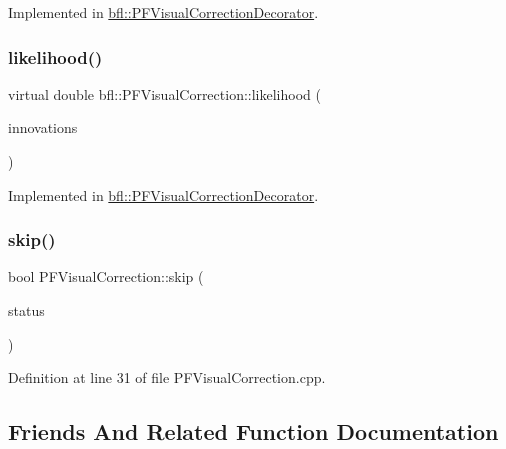 Implemented in \mbox{\hyperlink{classbfl_1_1PFVisualCorrectionDecorator_abf6fcd12be618e8eda474b4c9638760e}{bfl\+::\+P\+F\+Visual\+Correction\+Decorator}}.

\mbox{\label{classbfl_1_1PFVisualCorrection_a57527f43323af18321bd9654a4bb00d5}} 
\subsubsection{\texorpdfstring{likelihood()}{likelihood()}}
{\footnotesize\ttfamily virtual double bfl\+::\+P\+F\+Visual\+Correction\+::likelihood (\begin{DoxyParamCaption}\item[{const Eigen\+::\+Ref$<$ const Eigen\+::\+Matrix\+Xf $>$ \&}]{innovations }\end{DoxyParamCaption})\hspace{0.3cm}{\ttfamily [pure virtual]}}



Implemented in \mbox{\hyperlink{classbfl_1_1PFVisualCorrectionDecorator_a6e1f993c57e8bdbb03ad6996aa122c6c}{bfl\+::\+P\+F\+Visual\+Correction\+Decorator}}.

\mbox{\label{classbfl_1_1PFVisualCorrection_afbe70e2ab0be5459c79fe4eabd27cf9f}} 
\subsubsection{\texorpdfstring{skip()}{skip()}}
{\footnotesize\ttfamily bool P\+F\+Visual\+Correction\+::skip (\begin{DoxyParamCaption}\item[{const bool}]{status }\end{DoxyParamCaption})}



Definition at line 31 of file P\+F\+Visual\+Correction.\+cpp.



\subsection{Friends And Related Function Documentation}
\mbox{\label{classbfl_1_1PFVisualCorrection_a4d2412d32e038a7e3df6ffe3aca5896e}} 

